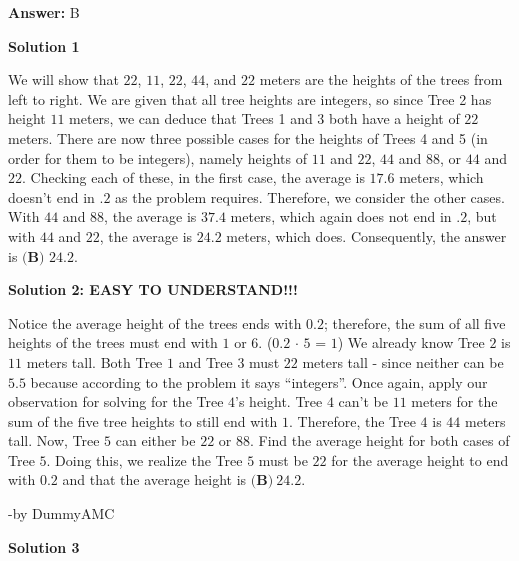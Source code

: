 \begin{enumerate}
 \textbf{Answer: }B



\textbf{Solution 1}

We will show that $22$, $11$, $22$, $44$, and $22$ meters are the heights of the trees from left to right. We are given that all tree heights are integers, so since Tree 2 has height $11$ meters, we can deduce that Trees 1 and 3 both have a height of $22$ meters. There are now three possible cases for the heights of Trees 4 and 5 (in order for them to be integers), namely heights of $11$ and $22$, $44$ and $88$, or $44$ and $22$. Checking each of these, in the first case, the average is $17.6$ meters, which doesn't end in $.2$ as the problem requires. Therefore, we consider the other cases. With $44$ and $88$, the average is $37.4$ meters, which again does not end in $.2$, but with $44$ and $22$, the average is $24.2$ meters, which does. Consequently, the answer is $\boxed{\textbf{(B) }24.2}$.

 



\textbf{Solution 2: EASY TO UNDERSTAND!!!}

Notice the average height of the trees ends with $0.2$; therefore, the sum of all five heights of the trees must end with $1$ or $6$. ($0.2$ $\cdot$ $5$ = $1$) We already know Tree $2$ is $11$ meters tall. Both Tree $1$ and Tree $3$ must $22$ meters tall - since neither can be $5.5$ because according to the problem it says “integers”. Once again, apply our observation for solving for the Tree $4$'s height. Tree $4$ can't be $11$ meters for the sum of the five tree heights to still end with $1$. Therefore, the Tree $4$ is $44$ meters tall. Now, Tree $5$ can either be $22$ or $88$. Find the average height for both cases of Tree $5$. Doing this, we realize the Tree $5$ must be $22$ for the average height to end with $0.2$ and that the average height is $\boxed{\textbf{(B)}\ 24.2}$.

 -by DummyAMC

 



\textbf{Solution 3}


\end{enumerate}
